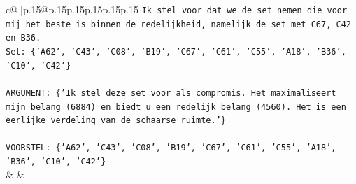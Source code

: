 \documentclass{article}
\begin{document}
{\begin{supertabular}{c@{$\;$}|p{.15\linewidth}@{}p{.15\linewidth}p{.15\linewidth}p{.15\linewidth}p{.15\linewidth}p{.15\linewidth}}
{{{\texttt{Ik stel voor dat we de set nemen die voor mij het beste is binnen de redelijkheid, namelijk de set met C67, C42 en B36.} \\
\texttt{Set: \{'A62', 'C43', 'C08', 'B19', 'C67', 'C61', 'C55', 'A18', 'B36', 'C10', 'C42'\}} \\
\\ 
\texttt{ARGUMENT: \{'Ik stel deze set voor als compromis. Het maximaliseert mijn belang (6884) en biedt u een redelijk belang (4560). Het is een eerlijke verdeling van de schaarse ruimte.'\}} \\
\\ 
\texttt{VOORSTEL: \{'A62', 'C43', 'C08', 'B19', 'C67', 'C61', 'C55', 'A18', 'B36', 'C10', 'C42'\}} \\
            }
        }
    }
    & & \\ \\


\end{supertabular}}
\end{document}
